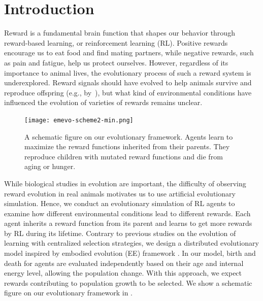 \section{Introduction}\label{sec:intro}
Reward is a fundamental brain function that shapes our behavior through reward-based learning, or reinforcement learning (RL). Positive rewards encourage us to eat food and find mating partners, while negative rewards, such as pain and fatigue, help us protect ourselves. However, regardless of its importance to animal lives, the evolutionary process of such a reward system is underexplored. Reward signals should have evolved to help animals survive and reproduce offspring (e.g., by~\cite{schultzNeuronalRewardDecision2015}), but what kind of environmental conditions have influenced the evolution of varieties of rewards remains unclear.

\begin{figure}[t]
  \centering{}
  \texttt{[image: emevo-scheme2-min.png]}
  \caption{
    A schematic figure on our evolutionary framework.
    Agents learn to maximize the reward functions inherited from their parents.
    They reproduce children with mutated reward functions and die from aging or hunger.
  }\label{figure:scheme}
\end{figure}


While biological studies in evolution are important, the difficulty of observing reward evolution in real animals motivates us to use artificial evolutionary simulation. Hence, we conduct an evolutionary simulation of RL agents to examine how different environmental conditions lead to different rewards. Each agent inherits a reward function from its parent and learns to get more rewards by RL during its lifetime. Contrary to previous studies on the evolution of learning \citep{hintonHowLearningCan1987,singhWhereRewardsCome2009} with centralized selection strategies, we design a distributed evolutionary model inspired by embodied evolution (EE) framework \citep{watsonEmbodiedEvolutionDistributing2002,bredecheEmbodiedEvolutionCollective2018}. In our model, birth and death for agents are evaluated independently based on their age and internal energy level, allowing the population change. With this approach, we expect rewards contributing to population growth to be selected. We show a schematic figure on our evolutionary framework in .

